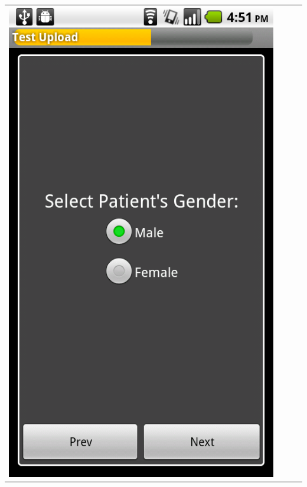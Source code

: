\documentclass[a4paper,10pt]{article}
\begin{document}
\begin{flushleft}
\begin{tabular}{ c c c c }
\includegraphics[scale=0.15,keepaspectratio=true]{client_proc_pt_gender.png}

\end{tabular}
\end{flushleft}
\end{document}
